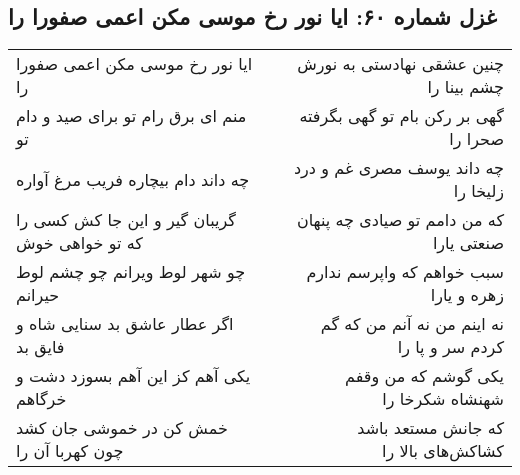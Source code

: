 \begin{center}
\section*{غزل شماره ۶۰: ایا نور رخ موسی مکن اعمی صفورا را}
\label{sec:0060}
\begin{longtable}{l p{0.5cm} r}
ایا نور رخ موسی مکن اعمی صفورا را
&&
چنین عشقی نهادستی به نورش چشم بینا را
\\
منم ای برق رام تو برای صید و دام تو
&&
گهی بر رکن بام تو گهی بگرفته صحرا را
\\
چه داند دام بیچاره فریب مرغ آواره
&&
چه داند یوسف مصری غم و درد زلیخا را
\\
گریبان گیر و این جا کش کسی را که تو خواهی خوش
&&
که من دامم تو صیادی چه پنهان صنعتی یارا
\\
چو شهر لوط ویرانم چو چشم لوط حیرانم
&&
سبب خواهم که واپرسم ندارم زهره و یارا
\\
اگر عطار عاشق بد سنایی شاه و فایق بد
&&
نه اینم من نه آنم من که گم کردم سر و پا را
\\
یکی آهم کز این آهم بسوزد دشت و خرگاهم
&&
یکی گوشم که من وقفم شهنشاه شکرخا را
\\
خمش کن در خموشی جان کشد چون کهربا آن را
&&
که جانش مستعد باشد کشاکش‌های بالا را
\\
\end{longtable}
\end{center}
